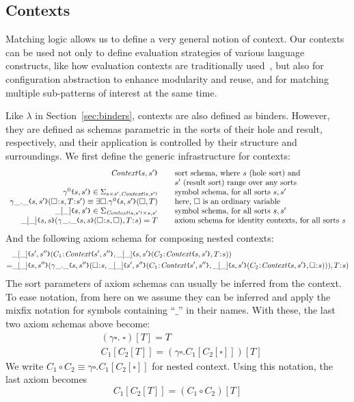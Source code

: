 \documentclass[acmsmall,review,anonymous]{acmart}
\newcommand{\cln}{\mathbin{\!:\!}}
\newcommand{\hole}{\square}
\newcommand{\parametric}[2]{{#1}\raisebox{.2ex}{\texttt{\footnotesize{\{}}}#2\raisebox{.2ex}{\texttt{\footnotesize{\}}}}}
\newcommand{\parametricscript}[2]{{#1}\raisebox{.2ex}{\texttt{\tiny{\{}}}#2\raisebox{.2ex}{\texttt{\tiny{\}}}}}
\newcommand{\Context}{\mathit{Context}}
\newcommand{\compose}{\circ}
\begin{document}
\subsection{Contexts}

Matching logic allows us to define a very general notion of context.
Our contexts can be used not only to define evaluation strategies of
various language constructs, like how evaluation contexts are
traditionally used~\cite{felleisen-hieb-92}, but also for configuration
abstraction to enhance modularity and reuse, and for matching multiple
sub-patterns of interest at the same time.

Like $\lambda$ in Section~\ref{sec:binders}, contexts are also defined
as binders.
However, they are defined as schemas parametric in the sorts of their
hole and result, respectively, and their application is controlled by
their structure and surroundings.
We first define the generic infrastructure for contexts:
$$
\begin{array}{r@{\hspace*{5ex}}l}
\parametric{\Context}{s,s'} &
\textrm{sort schema, where $s$ (hole sort) and}
\\ &\textrm{$s'$ (result sort) range over any sorts}
\\ \parametric{\gamma^0}{s,s'} \in \Sigma_{s \times s', 
\parametricscript{\Context}{s,s'}}
& \textrm{symbol schema, for all sorts $s, s'$}
\\ \parametric{\gamma\_.\_}{s,s'}(\hole\cln s,T\cln s') \equiv \exists \hole . 
\parametric{\gamma^0}{s,s'}(\hole,T)
& \textrm{here, $\hole$ is an ordinary variable}
\\
\parametric{\_[\_]}{s,s'} \in \Sigma_{\parametricscript{\Context}{s,s'} \times 
s, s'}
& \textrm{symbol schema, for all sorts $s, s'$}
\\
\parametric{\_[\_]}{s,s}(\parametric{\gamma\_.\_}{s,s}(\hole\cln s, 
\hole),T\cln s) = T
& \textrm{axiom schema for identity contexts, for all sorts $s$}
\end{array}
$$
And the following axiom schema for composing nested contexts:
\begin{align*}
&\parametric{\_[\_]}{s',s''}(C_1 \cln \parametric{\Context}{s',s''},
\parametric{\_[\_]}{s,s'}(C_2 \cln \parametric{\Context}{s,s'},
T\cln s))
\\
= &
\parametric{\_[\_]}{s,s''}(
\parametric{\gamma\_.\_}{s,s''}(\hole\cln s,
\parametric{\_[\_]}{s',s''}(
C_1 \cln \parametric{\Context}{s',s''},
\parametric{\_[\_]}{s,s'}(C_2 \cln \parametric{\Context}{s,s'},
\hole\cln s))
), T\cln s)
\end{align*}
The sort parameters of axiom schemas can usually be inferred from the context.
To ease notation, from here on we assume they can be inferred and apply the
mixfix notation for symbols containing ``$\_$'' in their names.
With these, the last two axiom schemas above become:
\begin{align*}
& (\gamma \hole .\; \hole)[T] = T \\
& C_1[C_2[T]] = (\gamma \hole . C_1[C_2[\hole]])[T]
\end{align*}
We write 
$C_1 \compose C_2 \equiv \gamma \hole . C_1[C_2[\hole]]$
for nested context.
Using this notation, the last axiom becomes
$$
C_1[C_2[T]] = (C_1 \compose C_2) [T]
$$
\end{document}
